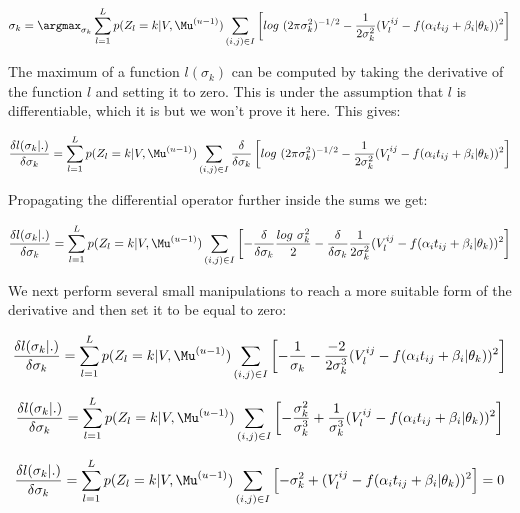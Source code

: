 \begin{equation}
 \sigma_k = \argmax_{\sigma_k} \sum_{l=1}^L p(Z_l = k | V, \Mu^{(u-1)}) \sum_{(i,j) \in I} \left[ log\ (2 \pi \sigma_k^2)^{-1/2} - \frac{1}{2\sigma_k^2}(V_l^{ij} - f(\alpha_i t_{ij} + \beta_i | \theta_k))^2 \right]
\end{equation}

The maximum of a function $l(\sigma_k)$ can be computed by taking the derivative of the function $l$ and setting it to zero. This is under the assumption that $l$ is differentiable, which it is but we won't prove it here. This gives:

\begin{equation}
 \frac{\delta l(\sigma_k|.)}{\delta \sigma_k} =  \sum_{l=1}^L p(Z_l = k | V, \Mu^{(u-1)}) \sum_{(i,j) \in I} \frac{\delta}{\delta \sigma_k} \left[ log\ (2 \pi \sigma_k^2)^{-1/2} - \frac{1}{2\sigma_k^2}(V_l^{ij} - f(\alpha_i t_{ij} + \beta_i | \theta_k))^2 \right]
\end{equation}

Propagating the differential operator further inside the sums we get:

\begin{equation}
 \frac{\delta l(\sigma_k|.)}{\delta \sigma_k} =  \sum_{l=1}^L p(Z_l = k | V, \Mu^{(u-1)}) \sum_{(i,j) \in I} \left[ -\frac{\delta}{\delta \sigma_k} \frac{log\ \sigma_k^2}{2} - \frac{\delta}{\delta \sigma_k} \frac{1}{2\sigma_k^2}(V_l^{ij} - f(\alpha_i t_{ij} + \beta_i | \theta_k))^2 \right]
\end{equation}

We next perform several small manipulations to reach a more suitable form of the derivative and then set it to be equal to zero:

\begin{equation}
 \frac{\delta l(\sigma_k|.)}{\delta \sigma_k} =  \sum_{l=1}^L p(Z_l = k | V, \Mu^{(u-1)}) \sum_{(i,j) \in I} \left[ - \frac{1}{\sigma_k} - \frac{-2}{2\sigma_k^3}(V_l^{ij} - f(\alpha_i t_{ij} + \beta_i | \theta_k))^2 \right]
\end{equation}

\begin{equation}
 \frac{\delta l(\sigma_k|.)}{\delta \sigma_k} =  \sum_{l=1}^L p(Z_l = k | V, \Mu^{(u-1)}) \sum_{(i,j) \in I} \left[ - \frac{\sigma_k^2}{\sigma_k^3} + \frac{1}{\sigma_k^3}(V_l^{ij} - f(\alpha_i t_{ij} + \beta_i | \theta_k))^2 \right]
\end{equation}

\begin{equation}
 \frac{\delta l(\sigma_k|.)}{\delta \sigma_k} =  \sum_{l=1}^L p(Z_l = k | V, \Mu^{(u-1)}) \sum_{(i,j) \in I} \left[ - \sigma_k^2 + (V_l^{ij} - f(\alpha_i t_{ij} + \beta_i | \theta_k))^2 \right] = 0
\end{equation}


